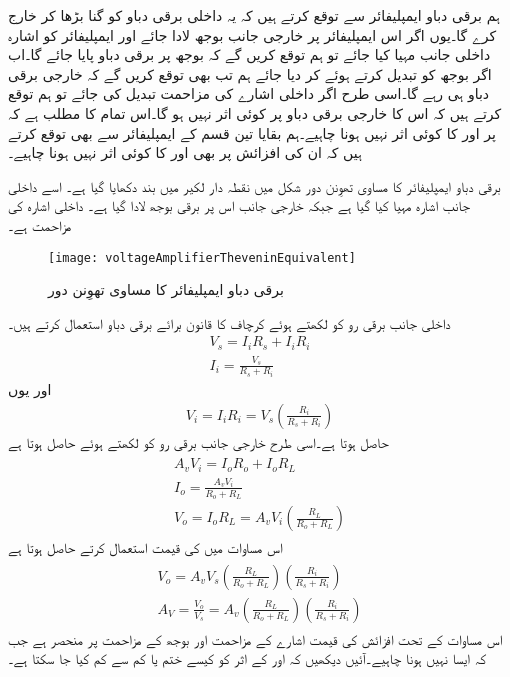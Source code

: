 ہم برقی دباو ایمپلیفائر سے توقع کرتے ہیں کہ یہ داخلی برقی دباو کو  گنا بڑھا کر خارج کرے گا۔یوں اگر اس ایمپلیفائر پر خارجی جانب  بوجھ لادا جائے اور ایمپلیفائر  کو  اشارہ داخلی جانب مہیا کیا جائے تو ہم توقع کریں گے کہ بوجھ پر  برقی دباو پایا جائے گا۔اب اگر بوجھ کو تبدیل کرتے ہوئے  کر دیا جائے ہم تب بھی توقع کریں گے کہ خارجی برقی دباو  ہی رہے گا۔اسی طرح اگر داخلی اشارے کی مزاحمت  تبدیل کی جائے تو ہم توقع کرتے ہیں کہ اس کا خارجی برقی دباو پر کوئی اثر نہیں ہو گا۔اس تمام کا مطلب ہے کہ  پر  اور  کا کوئی اثر نہیں ہونا چاہیے۔ہم بقایا تین قسم کے ایمپلیفائر سے بھی توقع کرتے ہیں کہ ان کی افزائش پر بھی  اور  کا کوئی اثر نہیں ہونا چاہیے۔

 برقی دباو ایمپلیفائر کا مساوی تھوِنن  دور شکل  میں نقطہ دار لکیر میں بند دکھایا گیا ہے۔ اسے داخلی جانب اشارہ  مہیا کیا گیا ہے جبکہ خارجی جانب اس پر برقی بوجھ  لادا گیا ہے۔ داخلی اشارہ کی مزاحمت  ہے۔
\begin{figure}
\centering
\texttt{[image: voltageAmplifierTheveninEquivalent]}
\caption{برقی دباو ایمپلیفائر کا مساوی تھوِنن  دور}
\label{شکل_واپسی_دباو_ایمپلیفائر_تھیونن_مساوی}
\end{figure}
داخلی جانب برقی رو کو   لکھتے ہوئے کرچاف کا قانون برائے برقی دباو استعمال کرتے ہیں۔
\begin{align*}
V_s=I_i R_s+I_i R_i \\
I_i = \frac{V_s}{R_s +R_i}
\end{align*}
اور یوں
\begin{align}
V_i=I_i R_i =V_s \left(\frac{R_i}{R_s+R_i} \right)
\end{align}
حاصل ہوتا ہے۔اسی طرح خارجی جانب برقی رو کو  لکھتے ہوئے حاصل  ہوتا ہے
\begin{gather}
\begin{aligned}\label{مساوات_واپسی_بنیادی_خارجی_حقائق_الف}
A_v V_i = I_o R_o + I_o R_L\\
I_o=\frac{A_v V_i}{R_o + R_L}\\
V_o=I_o R_L = A_v V_i  \left(\frac{R_L}{R_o+R_L}\right)
\end{aligned}
\end{gather}
اس مساوات میں  کی قیمت استعمال کرتے حاصل ہوتا ہے
\begin{gather} \label{مساوات_واپسی_دباو_ایمپلیفائر_کی_افزائش}
\begin{aligned}
V_o=A_v V_s \left (\frac{R_L }{R_o+R_L} \right)  \left (\frac{R_i}{R_s+R_i} \right) \\
A_V=\frac{V_o}{V_s}=A_v \left(\frac{R_L}{R_o+R_L} \right) \left(\frac{R_i}{R_s+R_i} \right )
\end{aligned}
\end{gather}
اس مساوات کے تحت افزائش کی قیمت اشارے کے مزاحمت  اور  بوجھ کے مزاحمت  پر منحصر ہے جب کہ ایسا نہیں ہونا چاہیے۔آئیں دیکھیں کہ  اور   کے اثر کو کیسے ختم یا کم سے کم کیا جا سکتا ہے۔

